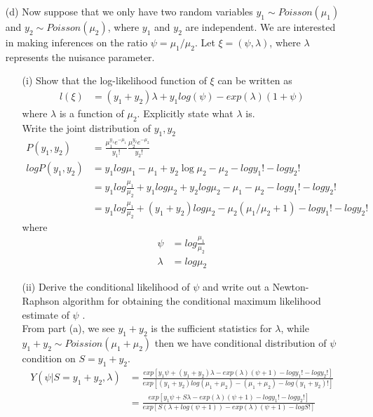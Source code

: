 \begin{itemize}
	\item[(d)] Now suppose that we only have two random variables $y_1 \sim Poisson(\mu_1)$ and $y_2 \sim
	Poisson(\mu_2)$, where $y_1$ and $y_2$ are independent. We are interested in making inferences on the ratio $\psi = \mu_1/\mu_2$. Let $\xi = (\psi , \lambda)$, where $\lambda$ represents the nuisance parameter.
	\begin{itemize}
		\item [(i)] Show that the log-likelihood function of $\xi$ can be written as
		\begin{align*}
			l(\xi) &= (y_1 + y_2)\lambda + y_1 log (\psi) - exp(\lambda) (1+\psi)
		\end{align*}
		where $\lambda$ is a function of $\mu_2$. Explicitly state what $\lambda$ is.\\
		Write the joint distribution of $y_1, y_2$
		\begin{align*}
			P(y_1, y_2) &= \frac{\mu_1^{y_1} e^{-\mu_1}}{y_1!} \frac{\mu_2^{y_2} e^{-\mu_2}}{y_2!} \\
			log P(y_1, y_2) &= y_1 log \mu_1 - \mu_1 + y_2 \log \mu_2 - \mu_2 - log y_1! - log y_2!\\
			&= y_1 log \frac{\mu_1}{\mu_2} + y_1 log \mu_2 + y_2 log \mu_2 -\mu_1 - \mu_2 -log y_1! - log y_2!\\
			&= y_1 log \frac{\mu_1}{\mu_2} + (y_1+y_2) log \mu_2 - \mu_2(\mu_1/\mu_2 + 1) -log y_1! - log y_2!
		\end{align*}
		where 
		\begin{align*}
			\psi &=log \frac{\mu_1}{\mu_2} \\
			\lambda &= log \mu_2
		\end{align*}
		\item[(ii)] Derive the conditional likelihood of $\psi$  and write out a Newton-Raphson algorithm for obtaining the conditional maximum likelihood estimate of $\psi$ .\\
		From part (a), we see $y_1 + y_2$ is the sufficient statistics for $\lambda$, while $y_1 + y_2 \sim Poission (\mu_1+\mu_2)$ then we have conditional distribution of $\psi$ condition on $S = y_1 + y_2$.
		\begin{align*}
			Y(\psi|S= y_1+y_2,\lambda) &= \frac{exp \left[ y_1 \psi + (y_1+y_2) \lambda - exp(\lambda)(\psi + 1) -log y_1! - log y_2! \right] }{exp \left[ (y_1+y_2) log (\mu_1+\mu_2) - (\mu_1+\mu_2) -log (y_1+y_2)!  \right]}\\
			&= \frac{exp \left[ y_1 \psi + S \lambda - exp(\lambda)(\psi + 1) -log y_1! - log y_2! \right] }{exp \left[ S (\lambda + log(\psi + 1)) -  exp(\lambda)(\psi + 1) -log S!  \right]}\\

\end{align*}
\end{itemize}
\end{itemize}
